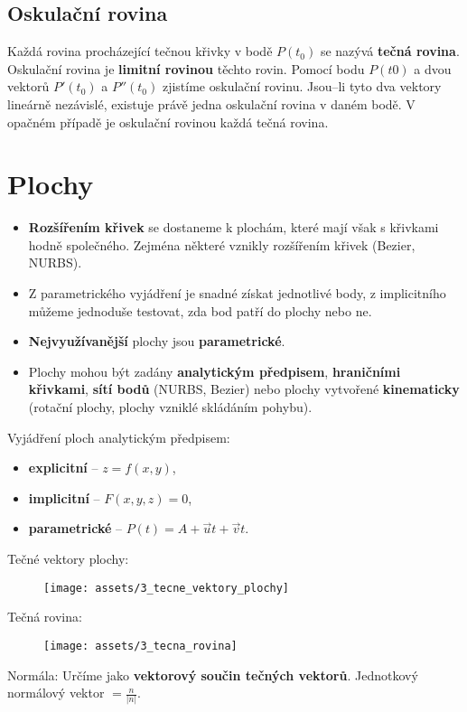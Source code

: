 \subsection{Oskulační rovina}
Každá rovina procházející tečnou křivky v bodě $P(t_0)$ se nazývá \textbf{tečná rovina}. Oskulační rovina je \textbf{limitní rovinou} těchto rovin. Pomocí bodu $P(t0)$ a dvou vektorů $P'(t_0)$ a $ P''(t_0)$ zjistíme oskulační rovinu. Jsou--li tyto dva vektory lineárně nezávislé, existuje právě jedna oskulační rovina v daném bodě. V opačném případě je oskulační rovinou každá tečná rovina.


\section{Plochy}
\begin{itemize}
    \item \textbf{Rozšířením křivek} se dostaneme k plochám, které mají však s křivkami hodně společného. Zejména některé vznikly rozšířením křivek (Bezier, NURBS).
\end{itemize}
\begin{itemize}
    \item Z parametrického vyjádření je snadné získat jednotlivé body, z implicitního můžeme jednoduše testovat, zda bod patří do plochy nebo ne.
    \item \textbf{Nejvyužívanější} plochy jsou \textbf{parametrické}.
    \item Plochy mohou být zadány \textbf{analytickým předpisem}, \textbf{hraničními křivkami}, \textbf{sítí bodů} (NURBS, Bezier) nebo plochy vytvořené \textbf{kinematicky} (rotační plochy, plochy vzniklé skládáním pohybu).
\end{itemize}
Vyjádření ploch analytickým předpisem:
\begin{itemize}
    \item \textbf{explicitní} -- $z = f(x, y)$,
    \item \textbf{implicitní} -- $F(x, y, z) = 0$,
    \item \textbf{parametrické} -- $	P (t) = A + \vec{u}t + \vec{v}t$.
\end{itemize}
Tečné vektory plochy:
\begin{figure}[H]
    \centering
    \texttt{[image: assets/3\_tecne\_vektory\_plochy]}
\end{figure}
Tečná rovina:
\begin{figure}[H]
    \centering
    \texttt{[image: assets/3\_tecna\_rovina]}
\end{figure}
Normála: Určíme jako \textbf{vektorový součin tečných vektorů}. Jednotkový normálový vektor  $=
    \frac{n}{|n|}$.

